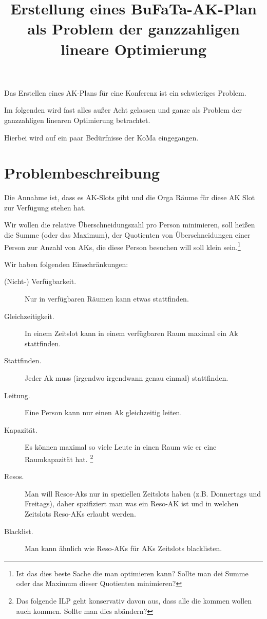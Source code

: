 \documentclass[A4]{article}
\title{Erstellung eines BuFaTa-AK-Plan als Problem der ganzzahligen lineare Optimierung}
\begin{document}
\maketitle


Das Erstellen eines AK-Plans für eine Konferenz ist ein schwieriges Problem.

Im folgenden wird fast alles außer Acht gelassen und ganze als Problem der ganzzahligen linearen Optimierung betrachtet.

Hierbei wird auf ein paar Bedürfnisse der KoMa eingegangen.

\section{Problembeschreibung}
Die Annahme ist, dass es  AK-Slots gibt und die Orga Räume für diese AK Slot zur Verfügung stehen hat.

Wir wollen die relative Überschneidungszahl pro Person minimieren,
soll heißen die Summe (oder das Maximum), der Quotienten von Überschneidungen einer Person zur Anzahl von AKs, die diese Person besuchen will soll klein sein.\footnote{Ist das dies beste Sache die man optimieren kann? Sollte man dei Summe oder das Maximum dieser Quotienten minimieren?}

Wir haben folgenden Einschränkungen:
\begin{description}
	\item[(Nicht-) Verfügbarkeit.] Nur in verfügbaren Räumen kann etwas stattfinden.
	\item[Gleichzeitigkeit.] In einem Zeitslot kann in einem verfügbaren Raum maximal ein Ak stattfinden.
	\item[Stattfinden.] Jeder Ak muss (irgendwo irgendwann genau einmal) stattfinden.
	\item[Leitung.] Eine Person kann nur einen Ak gleichzeitig leiten.
	\item[Kapazität.] Es können maximal so viele Leute in einen Raum wie er eine Raumkapazität hat.
	  \footnote{Das folgende ILP geht konservativ davon aus, dass alle die kommen wollen auch kommen. Sollte man dies abändern?}
	\item[Resos.] Man will Resos-Aks nur in speziellen Zeitslots haben (z.B. Donnertags und Freitags), daher spzifiziert man was ein Reso-AK ist und in welchen Zeitslots Reso-AKs erlaubt werden.
	\item[Blacklist.] Man kann ähnlich wie Reso-AKs für AKs Zeitslots blacklisten.
\end{description}
\end{document}
